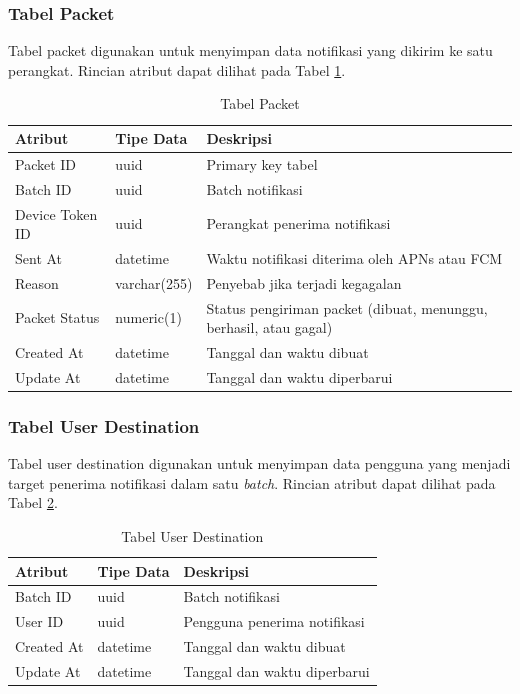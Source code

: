 \subsubsection{Tabel Packet} \label{s:tabel_packet}
\par Tabel packet digunakan untuk menyimpan data notifikasi yang dikirim ke satu perangkat. Rincian atribut dapat dilihat pada Tabel \ref{tabel_packet}.
\begin{longtable}{|p{2cm}|p{2.5cm}|p{4.5cm}|}
	\caption{Tabel Packet} \label{tabel_packet} \\ \hline
    \textbf{Atribut} & \textbf{Tipe Data} & \textbf{Deskripsi} \\ \hline
    Packet ID & uuid & Primary key tabel \\ \hline
    Batch ID & uuid & Batch notifikasi \\ \hline
    Device Token ID & uuid & Perangkat penerima notifikasi \\ \hline
    Sent At & datetime & Waktu notifikasi diterima oleh APNs atau FCM \\ \hline
    Reason & varchar(255) & Penyebab jika terjadi kegagalan \\ \hline
    Packet Status & numeric(1) & Status pengiriman packet (dibuat, menunggu, berhasil, atau gagal) \\ \hline
    Created At & datetime & Tanggal dan waktu dibuat \\ \hline
    Update At & datetime & Tanggal dan waktu diperbarui \\ \hline
\end{longtable}

\subsubsection{Tabel User Destination}
\par Tabel user destination digunakan untuk menyimpan data pengguna yang menjadi target penerima notifikasi dalam satu \textit{batch}. Rincian atribut dapat dilihat pada Tabel \ref{tabel_user_destination}.
\begin{longtable}{|p{2cm}|p{2.5cm}|p{4.5cm}|}
	\caption{Tabel User Destination} \label{tabel_user_destination} \\ \hline
    \textbf{Atribut} & \textbf{Tipe Data} & \textbf{Deskripsi} \\ \hline
    Batch ID & uuid & Batch notifikasi \\ \hline
    User ID & uuid & Pengguna penerima notifikasi \\ \hline
    Created At & datetime & Tanggal dan waktu dibuat \\ \hline
    Update At & datetime & Tanggal dan waktu diperbarui \\ \hline
\end{longtable}

